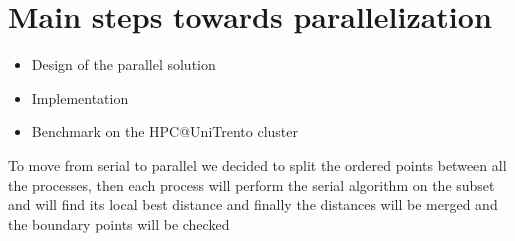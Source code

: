\section{Main steps towards parallelization}
\label{sec:parallelization}

\begin{itemize}
  \item Design of the parallel solution
  \item Implementation
  \item Benchmark on the HPC@UniTrento cluster
\end{itemize}

To move from serial to parallel we decided to split the ordered
points between all the processes, then each process will perform
the serial algorithm on the subset and will find its local best distance and
finally the distances will be merged and the boundary points will be checked
